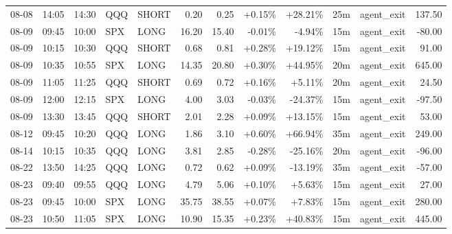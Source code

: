 \documentclass[11pt,a4paper]{article}
\begin{document}
\begin{center}
\begin{longtable}{>{\color{txtmain}}l l l l l r r r r r >{\color{txtmain}}l r}
08-08 & 14:05 & 14:30 & QQQ & SHORT & 0.20 & 0.25 & \textcolor{wingreen}{+0.15\%} & \textcolor{wingreen}{+28.21\%} & 25m & agent\_exit & \textcolor{wingreen}{137.50} \\
08-09 & 09:45 & 10:00 & SPX & LONG & 16.20 & 15.40 & \textcolor{lossred}{-0.01\%} & \textcolor{lossred}{-4.94\%} & 15m & agent\_exit & \textcolor{lossred}{-80.00} \\
08-09 & 10:15 & 10:30 & QQQ & SHORT & 0.68 & 0.81 & \textcolor{wingreen}{+0.28\%} & \textcolor{wingreen}{+19.12\%} & 15m & agent\_exit & \textcolor{wingreen}{91.00} \\
08-09 & 10:35 & 10:55 & SPX & LONG & 14.35 & 20.80 & \textcolor{wingreen}{+0.30\%} & \textcolor{wingreen}{+44.95\%} & 20m & agent\_exit & \textcolor{wingreen}{645.00} \\
08-09 & 11:05 & 11:25 & QQQ & SHORT & 0.69 & 0.72 & \textcolor{wingreen}{+0.16\%} & \textcolor{wingreen}{+5.11\%} & 20m & agent\_exit & \textcolor{wingreen}{24.50} \\
08-09 & 12:00 & 12:15 & SPX & LONG & 4.00 & 3.03 & \textcolor{lossred}{-0.03\%} & \textcolor{lossred}{-24.37\%} & 15m & agent\_exit & \textcolor{lossred}{-97.50} \\
08-09 & 13:30 & 13:45 & QQQ & SHORT & 2.01 & 2.28 & \textcolor{wingreen}{+0.09\%} & \textcolor{wingreen}{+13.15\%} & 15m & agent\_exit & \textcolor{wingreen}{53.00} \\
08-12 & 09:45 & 10:20 & QQQ & LONG & 1.86 & 3.10 & \textcolor{wingreen}{+0.60\%} & \textcolor{wingreen}{+66.94\%} & 35m & agent\_exit & \textcolor{wingreen}{249.00} \\
08-14 & 10:15 & 10:35 & QQQ & LONG & 3.81 & 2.85 & \textcolor{lossred}{-0.28\%} & \textcolor{lossred}{-25.16\%} & 20m & agent\_exit & \textcolor{lossred}{-96.00} \\
08-22 & 13:50 & 14:25 & QQQ & LONG & 0.72 & 0.62 & \textcolor{wingreen}{+0.09\%} & \textcolor{lossred}{-13.19\%} & 35m & agent\_exit & \textcolor{lossred}{-57.00} \\
08-23 & 09:40 & 09:55 & QQQ & LONG & 4.79 & 5.06 & \textcolor{wingreen}{+0.10\%} & \textcolor{wingreen}{+5.63\%} & 15m & agent\_exit & \textcolor{wingreen}{27.00} \\
08-23 & 09:45 & 10:00 & SPX & LONG & 35.75 & 38.55 & \textcolor{wingreen}{+0.07\%} & \textcolor{wingreen}{+7.83\%} & 15m & agent\_exit & \textcolor{wingreen}{280.00} \\
08-23 & 10:50 & 11:05 & SPX & LONG & 10.90 & 15.35 & \textcolor{wingreen}{+0.23\%} & \textcolor{wingreen}{+40.83\%} & 15m & agent\_exit & \textcolor{wingreen}{445.00} \\

\end{longtable}
\end{center}
\end{document}
